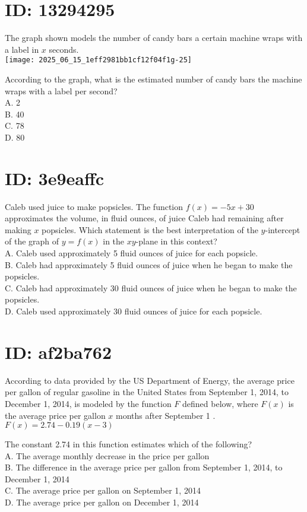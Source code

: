 \section*{ID: 13294295}
The graph shown models the number of candy bars a certain machine wraps with a label in $x$ seconds.\\
\texttt{[image: 2025\_06\_15\_1eff2981bb1cf12f04f1g-25]}

According to the graph, what is the estimated number of candy bars the machine wraps with a label per second?\\
A. 2\\
B. 40\\
C. 78\\
D. 80

\section*{ID: 3e9eaffc}
Caleb used juice to make popsicles. The function $f(x)=-5 x+30$ approximates the volume, in fluid ounces, of juice Caleb had remaining after making $x$ popsicles. Which statement is the best interpretation of the $y$-intercept of the graph of $y=f(x)$ in the $x y$-plane in this context?\\
A. Caleb used approximately 5 fluid ounces of juice for each popsicle.\\
B. Caleb had approximately 5 fluid ounces of juice when he began to make the popsicles.\\
C. Caleb had approximately 30 fluid ounces of juice when he began to make the popsicles.\\
D. Caleb used approximately 30 fluid ounces of juice for each popsicle.

\section*{ID: af2ba762}
According to data provided by the US Department of Energy, the average price per gallon of regular gasoline in the United States from September 1, 2014, to December 1, 2014, is modeled by the function $F$ defined below, where $F(x)$ is the average price per gallon $x$ months after September 1 .\\
$F(x)=2.74-0.19(x-3)$

The constant 2.74 in this function estimates which of the following?\\
A. The average monthly decrease in the price per gallon\\
B. The difference in the average price per gallon from September 1, 2014, to December 1, 2014\\
C. The average price per gallon on September 1, 2014\\
D. The average price per gallon on December 1, 2014

